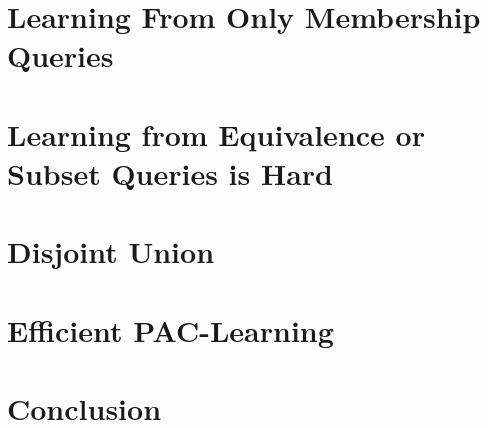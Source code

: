 \section{Learning From Only Membership Queries}


\section{Learning from Equivalence or Subset Queries is Hard}


\section{Disjoint Union}


\section{Efficient PAC-Learning}


\section{Conclusion}





  